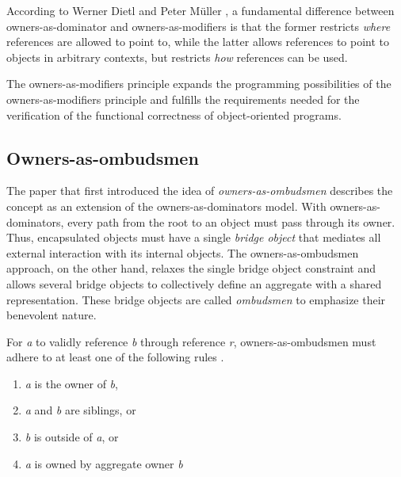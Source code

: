 \documentclass[sigplan,11pt,nonacm]{acmart}
\begin{document}
According to Werner Dietl and Peter Müller \cite{lightweight-ownership}, a fundamental difference between owners-as-dominator and owners-as-modifiers is that the former restricts \emph{where} references are allowed to point to, while the latter allows references to point to objects in arbitrary contexts, but restricts \emph{how} references can be used.

The owners-as-modifiers principle expands the programming possibilities of the owners-as-modifiers principle and fulfills the requirements needed for the verification of the functional correctness of object-oriented programs.


\subsection{Owners-as-ombudsmen}
\label{sec:owners-as-ombudsmen}

The paper that first introduced the idea of \emph{owners-as-ombudsmen} \cite{owners-as-ombudsmen} describes the concept as an extension of the owners-as-dominators model.
With owners-as-dominators, every path from the root to an object must pass through its owner.
Thus, encapsulated objects must have a single \emph{bridge object} that mediates all external interaction with its internal objects.
The owners-as-ombudsmen approach, on the other hand, relaxes the single bridge object constraint and allows several bridge objects to collectively define an aggregate with a shared representation.
These bridge objects are called \emph{ombudsmen} to emphasize their benevolent nature.


For \emph{a} to validly reference \emph{b} through reference \emph{r}, owners-as-ombudsmen must adhere to at least one of the following rules \cite{ownership-types-survey}.
\begin{enumerate}
  \item \emph{a} is the owner of \emph{b},
  \item \emph{a} and \emph{b} are siblings, or
  \item \emph{b} is outside of \emph{a}, or
  \item \emph{a} is owned by aggregate owner \emph{b}
\end{enumerate}
\end{document}
